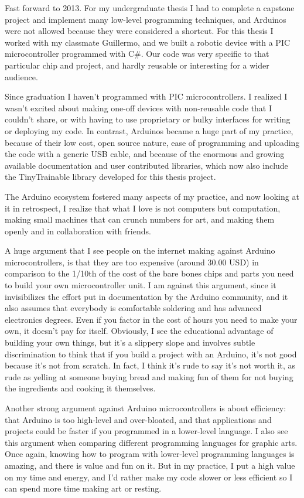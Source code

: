 Fast forward to 2013. For my undergraduate thesis I had to complete a capstone project and implement many low-level programming techniques, and Arduinos were not allowed because they were considered a shortcut. For this thesis I worked with my classmate Guillermo, and we built a robotic device with a \acrshort{PIC} microcontroller programmed with C\#. Our code was very specific to that particular chip and project, and hardly reusable or interesting for a wider audience.

Since graduation I haven't programmed with \acrshort{PIC} microcontrollers. I realized I wasn't excited about making one-off devices with non-reusable code that I couldn't share, or with having to use proprietary or bulky interfaces for writing or deploying my code. In contrast, Arduinos became a huge part of my practice, because of their low cost, open source nature, ease of programming and uploading the code with a generic USB cable, and because of the enormous and growing available documentation and user contributed libraries, which now also include the TinyTrainable library developed for this thesis project.

The Arduino ecosystem fostered many aspects of my practice, and now looking at it in retrospect, I realize that what I love is not computers but computation, making small machines that can crunch numbers for art, and making them openly and in collaboration with friends.

A huge argument that I see people on the internet making against Arduino microcontrollers, is that they are too expensive (around 30.00 USD) in comparison to the 1/10th of the cost of the bare bones chips and parts you need to build your own microcontroller unit. I am against this argument, since it invisibilizes the effort put in documentation by the Arduino community, and it also assumes that everybody is comfortable soldering and has advanced electronics degrees. Even if you factor in the cost of hours you need to make your own, it doesn't pay for itself. Obviously, I see the educational advantage of building your own things, but it's a slippery slope and involves subtle discrimination to think that if you build a project with an Arduino, it's not good because it's not from scratch. In fact, I think it's rude to say it's not worth it, as rude as yelling at someone buying bread and making fun of them for not buying the ingredients and cooking it themselves.

Another strong argument against Arduino microcontrollers is about efficiency: that Arduino is too high-level and over-bloated, and that applications and projects could be faster if you programmed in a lower-level language. I also see this argument when comparing different programming languages for graphic arts. Once again, knowing how to program with lower-level programming languages is amazing, and there is value and fun on it. But in my practice, I put a high value on my time and energy, and I'd rather make my code slower or less efficient so I can spend more time making art or resting.

